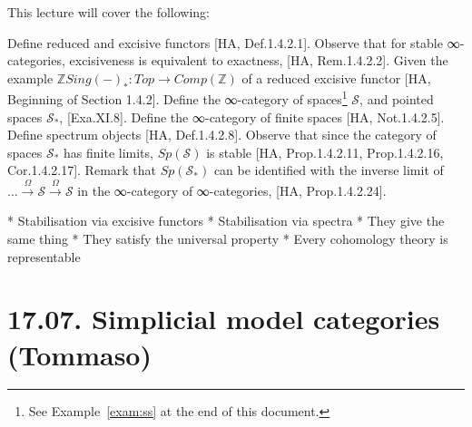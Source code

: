 \documentclass[a4paper]{amsart}
\numberwithin{figure}{section}
\theoremstyle{theorem}
\theoremstyle{definition}
\newcommand{\ZZ}{\mathbb{Z}}
\newcommand{\Sp}{{\mathcal{S}}}
\begin{document}
This lecture will cover the following:

Define reduced and excisive functors [HA, Def.1.4.2.1]. %
Observe that for stable ∞-categories, excisiveness is equivalent to exactness, [HA, Rem.1.4.2.2]. %
Given the example $\ZZ Sing(-)_*: Top → Comp(\ZZ)$ of a reduced excisive functor [HA, Beginning of Section 1.4.2]. %
Define the ∞-category of spaces\footnote{%
See Example~\ref{exam:ss} at the end of this document.
} %
$\Sp$, and pointed spaces $\Sp_*$,  [Exa.XI.8]. %
Define the ∞-category of finite spaces [HA, Not.1.4.2.5]. %
Define spectrum objects [HA, Def.1.4.2.8]. %
Observe that since the category of spaces $\Sp_*$ has finite limits, $Sp(\Sp)$ is stable [HA, Prop.1.4.2.11, Prop.1.4.2.16, Cor.1.4.2.17]. %
Remark that $Sp(\Sp_*)$ can be identified with the inverse limit of $\dots \stackrel{\Omega}{\to} \Sp \stackrel{\Omega}{\to} \Sp$ in the ∞-category of ∞-categories, [HA, Prop.1.4.2.24]. 


* Stabilisation via excisive functors
* Stabilisation via spectra
* They give the same thing
* They satisfy the universal property
* Every cohomology theory is representable





%
%
%
%
%
%
%
%
%
%
%

\section{17.07. Simplicial model categories (Tommaso)}
\end{document}
